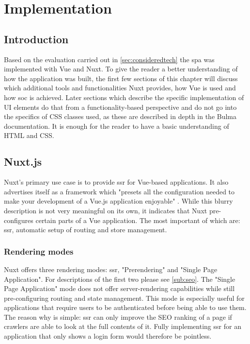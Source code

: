 \chapter[Implementation]{Implementation} \label{ch:implementation}

\section{Introduction}
Based on the evaluation carried out in \autoref{sec:consideredtech} the \acrlong{spa} was implemented with Vue and Nuxt. To give the reader a better understanding of how the application was built, the first few sections of this chapter will discuss which additional tools and functionalities Nuxt provides, how Vue is used and how \acrfull{soc} is achieved. Later sections which describe the specific implementation of UI elements do that from a functionality-based perspective and do not go into the specifics of CSS classes used, as these are described in depth in the Bulma documentation. It is enough for the reader to have a basic understanding of HTML and CSS.

\section{Nuxt.js}
Nuxt's primary use case is to provide \acrlong{ssr} for Vue-based applications. It also advertises itself as a framework which "presets all the configuration needed to make your development of a Vue.js application enjoyable" \cite{Nuxtjs:online}. While this blurry description is not very meaningful on its own, it indicates that Nuxt pre-configures certain parts of a Vue application. The most important of which are: \acrlong{ssr}, automatic setup of routing and store management.

\subsection{Rendering modes}
Nuxt offers three rendering modes: \acrshort{ssr}, "Prerendering" and "Single Page Application". For descriptions of the first two please see \autoref{sub:seo}. The "Single Page Application" mode does not offer server-rendering capabilities while still pre-configuring routing and state management. This mode is especially useful for applications that require users to be authenticated before being able to use them. The reason why is simple: \acrlong{ssr} can only improve the SEO ranking of a page if crawlers are able to look at the full contents of it. Fully implementing \acrshort{ssr} for an application that only shows a login form would therefore be pointless. 

